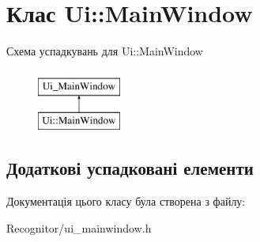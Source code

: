 \hypertarget{classUi_1_1MainWindow}{\section{Клас Ui\-:\-:Main\-Window}
\label{classUi_1_1MainWindow}
}
Схема успадкувань для Ui\-:\-:Main\-Window\begin{figure}[H]
\begin{center}
\leavevmode
\includegraphics[height=2.000000cm]{classUi_1_1MainWindow}
\end{center}
\end{figure}
\subsection*{Додаткові успадковані елементи}


Документація цього класу була створена з файлу\-:\begin{DoxyCompactItemize}
\item 
Recognitor/ui\-\_\-mainwindow.\-h\end{DoxyCompactItemize}
